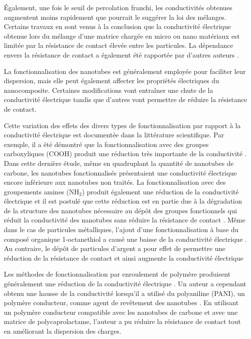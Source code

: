 Également, une fois le seuil de percolation franchi, les conductivités obtenues augmentent moins rapidement que pourrait le suggérer la loi des mélanges. 
Certains travaux \cite{Untereker2009,Cauchy2018} en sont venus à la conclusion que la conductivité électrique obtenue lors du mélange d'une matrice chargée en micro ou nano matériaux est limitée par la résistance de contact élevée entre les particules. 
La dépendance envers la résistance de contact a également été rapportée par d'autres auteurs \cite{Li2007a}. 

La fonctionnalisation des nanotubes est généralement employée pour faciliter leur dispersion, mais elle peut également affecter les propriétés électriques du nanocomposite. 
Certaines modifications vont entraîner une chute de la conductivité électrique tandis que d'autres vont permettre de réduire la résistance de contact. 

\FloatBarrier
Cette variation des effets des divers types de fonctionnalisation par rapport à la conductivité électrique est documentée dans la littérature scientifique. 
Par exemple, il a été démontré que la fonctionnalisation avec des groupes carboxyliques (COOH) produit une réduction très importante de la conductivité \cite{Guadagno2011}. 
Dans cette dernière étude, même en quadruplant la quantité de nanotubes de carbone, les nanotubes fonctionnalisés présentaient une conductivité électrique encore inférieure aux nanotubes non traités. 
La fonctionnalisation avec des groupements amines (NH$_2$) produit également une réduction de la conductivité électrique \cite{Ma2008} et il est postulé que cette réduction est en partie due à la dégradation de la structure des nanotubes nécessaire au dépôt des groupes fonctionnels qui réduit la conductivité des nanotubes sans réduire la résistance de contact \cite{Pandey2012a}.
Même dans le cas de particules métalliques, l'ajout d'une fonctionnalisation à base du composé organique 
1-octanethiol a causé une baisse de la conductivité électrique \cite{Gelves2008a}. 
Au contraire, le dépôt de particules d'argent a pour effet de permettre une réduction de la résistance de contact et ainsi augmente la conductivité électrique  \cite{Ma2010,Cauchy2017}

Les méthodes de fonctionnalisation par enroulement de polymère produisent généralement une réduction de la conductivité électrique \cite{Diez-Pascual2010, Huang2012}. 
Un auteur a cependant obtenu une hausse de la conductivité lorsqu'il a utilisé du polyaniline (PANI), un polymère conducteur, comme agent de revêtement des nanotubes \cite{Vankayala2011}. 
En utilisant un polymère conducteur compatible avec les nanotubes de carbone et avec une matrice de polycaprolactame, l'auteur a pu réduire la résistance de contact tout en améliorant la dispersion des charges. 

